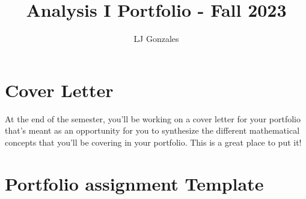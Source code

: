 \documentclass[11 pt]{article}
\title{Analysis I Portfolio - Fall 2023} %
\author{LJ Gonzales} %
\date{} %
\begin{document}
\maketitle

\section{Cover Letter}

At the end of the semester, you'll be working on a cover letter for your portfolio that's meant as an opportunity for you to synthesize the different mathematical concepts that you'll be covering in your portfolio. This is a great place to put it!

\pagebreak
\section{Portfolio assignment Template}
\end{document}
